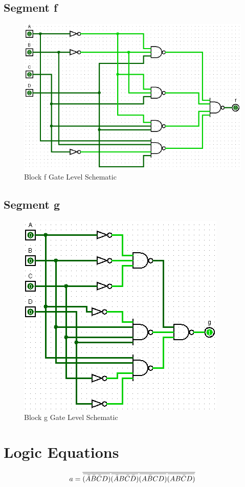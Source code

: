 \documentclass[12pt]{article}
\newcommand{\overbar}[1]{\mkern 1.5mu\overline{\mkern-1.5mu#1\mkern-1.5mu}\mkern 1.5mu} %
\begin{document}
\subsection{Segment f}
\begin{figure}[H]
	\centering
	\label{fig:fBlockGates}
	\includegraphics[width=0.65\linewidth, keepaspectratio]{f_logicCkt}
	\caption{Block f Gate Level Schematic}
\end{figure}

\subsection{Segment g}
\begin{figure}[H]
	\centering
	\label{fig:gBlockGates}
	\includegraphics[width=0.65\linewidth, keepaspectratio]{g_logicCkt}
	\caption{Block g Gate Level Schematic}
\end{figure}


\section{Logic Equations}
\label{app:logicEquations}
\begin{equation}
a = \overline{\overbar{(\bar{A}\bar{B}\bar{C}D)}\overbar{(\bar{A}B\bar{C}\bar{D})}\overbar{(A\bar{B}CD)}\overbar{(AB\bar{C}D)}}
\end{equation}
\end{document}
